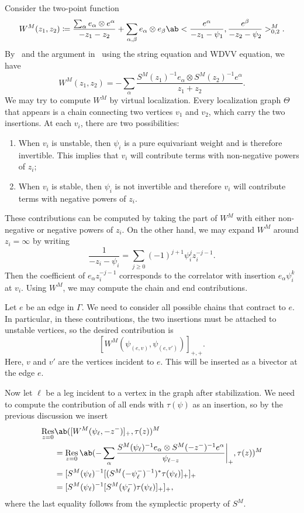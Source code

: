 \documentclass[10pt]{amsart}
\theoremstyle{definition}
\theoremstyle{remark}
\theoremstyle{plain}
\theoremstyle{definition}
\theoremstyle{remark}
\newcommand{\1}{\mathbf{1}}
\newcommand{\2}{\mathbf{2}}
\newcommand{\3}{\mathbf{3}}
\DeclareMathOperator{\Res}{Res}
\numberwithin{equation}{section}
\begin{document}
Consider the two-point function
\[ W^M(z_1, z_2) \coloneqq \frac{\sum_{\alpha} e_{\alpha} \otimes e^{\alpha}}{-z_1-z_2} + \sum_{\alpha,\beta} e_{\alpha} \otimes e_{\beta} \ab<\frac{e^{\alpha}}{-z_1-\psi_1}, \frac{e^{\beta}}{-z_2-\psi_2}>_{0,2}^M. \]
By~ and the argument in~\cite[\S 1]{ellgwmirror} using the string equation and WDVV equation, we have
\begin{equation}\label{eqn:wtensorsmatrix}
    W^M(z_1, z_2) = - \sum_{\alpha} \frac{S^M(z_1)^{-1} e_{\alpha} \otimes S^M(z_2)^{-1} e^{\alpha}}{z_1+z_2}.
\end{equation}
We may try to compute $W^M$ by virtual localization. Every localization graph $\Theta$ that appears is a chain connecting two vertices $v_1$ and $v_2$, which carry the two insertions. At each $v_i$, there are two possibilities:
\begin{enumerate}
    \item When $v_i$ is unstable, then $\psi_i$ is a pure equivariant weight and is therefore invertible. This implies that $v_i$ will contribute terms with non-negative powers of $z_i$;
    \item When $v_i$ is stable, then $\psi_i$ is not invertible and therefore $v_i$ will contribute terms with negative powers of $z_i$.
\end{enumerate}
These contributions can be computed by taking the part of $W^M$ with either non-negative or negative powers of $z_i$. On the other hand, we may expand $W^M$ around $z_i = \infty$ by writing
\[ \frac{1}{-z_i-\psi_i} = \sum_{j\geq 0} (-1)^{j+1}\psi_i^j z_i^{-j-1}. \]
Then the coefficient of $e_{\alpha}z_i^{-j-1}$ corresponds to the correlator with insertion $e_{\alpha}\psi_i^{k}$ at $v_i$.
Using $W^M$, we may compute the chain and end contributions.

Let $e$ be an edge in $\Gamma$. We need to consider all possible chains that contract to $e$. In particular, in these contributions, the two insertions must be attached to unstable vertices, so the desired contribution is
\[ [W^M(\psi_{(e,v)}, \psi_{(e, v')})]_{+,+}. \]
Here, $v$ and $v'$ are the vertices incident to $e$. This will be inserted as a bivector at the edge $e$.

Now let $\ell$ be a leg incident to a vertex in the graph after stabilization. We need to compute the contribution of all ends with $\tau(\psi)$ as an insertion, so by the previous discussion we insert
\begin{align*}
    \Res_{z=0}&\ab([W^M(\psi_{\ell}, -z^-)]_+, \tau(z))^M \\
    &= \Res_{z=0}\ab(-\sum_{\alpha} \frac{S^M(\psi_{\ell})^{-1}e_{\alpha}\otimes S^M(-z^-)^{-1} e^{\alpha}}{\psi_{\ell-z}}\bigg\vert_+, \tau(z))^M \\
    &= [S^M(\psi_{\ell})^{-1}[( S^M(-\psi_{\ell}^-)^{-1} )^* \tau(\psi_{\ell})]_+]_+ \\
    &= [S^M(\psi_{\ell})^{-1} [S^M(\psi_{\ell}^-)\tau(\psi_{\ell})]_+]_+,
\end{align*}
where the last equality follows from the symplectic property of $S^M$.
\end{document}
